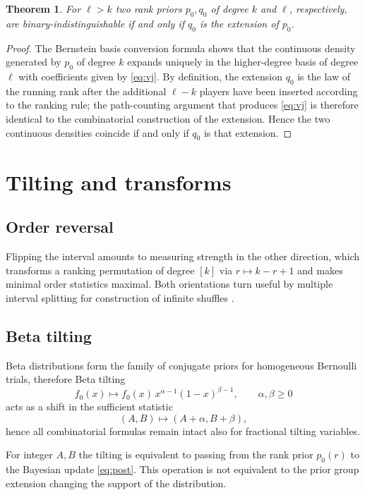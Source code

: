 \documentclass[11pt,reqno]{amsart}
\newtheorem{theorem}{Theorem}[section]
\theoremstyle{definition}
\theoremstyle{remark}
\numberwithin{equation}{section}
\begin{document}
\begin{theorem}
For \(\ell>k\) two rank priors \(p_0,q_0\) of degree \(k\) and \(\ell\), respectively, are binary-indistinguishable if and only if \(q_0\) is the extension of \(p_0\).
\end{theorem}

\begin{proof}
The Bernstein basis conversion formula shows that the continuous density generated by \(p_0\) of degree \(k\) expands uniquely in the higher-degree basis of degree \(\ell\) with coefficients given by \eqref{eq:vj}. By definition, the extension \(q_0\) is the law of the running rank after the additional \(\ell-k\) players have been inserted according to the ranking rule; the path-counting argument that produces \eqref{eq:vj} is therefore identical to the combinatorial construction of the extension. Hence the two continuous densities coincide if and only if \(q_0\) is that extension.
\end{proof}

\section{Tilting and transforms}

\subsection{Order reversal}

Flipping the interval amounts to measuring strength in the other direction, which transforms a ranking permutation of degree \([k]\) via \(r\mapsto k-r+1\) and makes minimal order statistics maximal. Both orientations turn useful by multiple interval splitting for construction of infinite shuffles \cite{GnedinOlshanski2006,JackaWarren2007}.

\subsection{Beta tilting}

Beta distributions form the family of conjugate priors for homogeneous Bernoulli trials, therefore Beta tilting
\[
f_0(x)\mapsto f_0(x)\,x^{\alpha-1}(1-x)^{\beta-1},\qquad\alpha,\beta\ge0
\]
acts as a shift in the sufficient statistic
\[
(A,B)\mapsto(A+\alpha,B+\beta),
\]
hence all combinatorial formulas remain intact also for fractional tilting variables.

For integer \(A,B\) the tilting is equivalent to passing from the rank prior \(p_0(r)\) to the Bayesian update \eqref{eq:post}. This operation is not equivalent to the prior group extension changing the support of the distribution.
\end{document}
